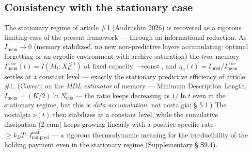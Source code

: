 \documentclass[pdflatex,sn-mathphys-ay]{sn-jnl}
\begin{document}
\subsection{Consistency with the stationary case}\label{consistency-with-the-stationary-case}



The stationary regime of article \#1 (Andriishin 2026) is recovered as a rigorous limiting case of the present framework --- through an informational reduction. As \(\dot I_{\text{mem}} \to 0\) (memory stabilized, no new non-predictive layers accumulating: optimal forgetting or an ergodic environment with archive saturation) the \emph{true} memory \(I_{\text{mem}}^{\text{true}}(t) = I(M_t; X_E^{\le t})\) at fixed capacity \(\to \text{const}\), and \(\eta_v(t) = I_{\text{pred}}/I_{\text{mem}}^{\text{true}}\) settles at a constant level --- exactly the stationary predictive efficiency of article \#1. (Caveat: on the \emph{MDL estimator} of memory --- Minimum Description Length, \(I_{\text{mem}} = (K/2)\ln N_{\text{obs}}\) --- the ratio keeps decreasing as \(1/\ln t\) even in the stationary regime, but this is \emph{data accumulation}, not nostalgia; § 5.1.) The nostalgia \(\nu(t)\) then stabilizes at a constant level, while the cumulative dissipation (2-cum) keeps growing linearly with a positive specific rate \(\ge k_B T \cdot \overline{I_{\text{nonpred}}^{\text{inst}}}\) --- a rigorous thermodynamic meaning for the irreducibility of the holding payment even in the stationary regime (Supplementary § S9.4).
\end{document}
